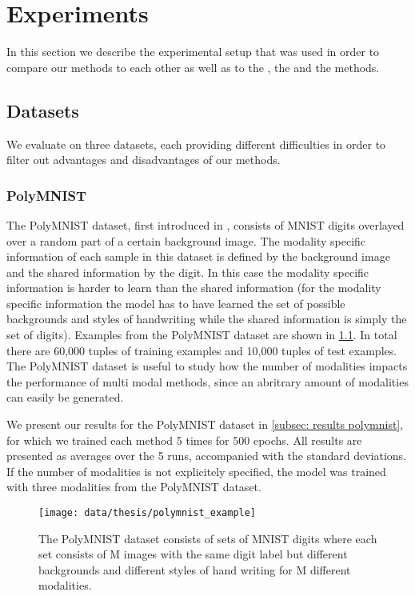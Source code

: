 \chapter{Experiments}
In this section we describe the experimental setup that was used in order to compare our methods to each other as well as to the , the  and the  methods.


\section{Datasets}
We evaluate on three datasets, each providing different difficulties in order to filter out advantages and disadvantages of our methods.

\subsection{PolyMNIST} \label{polymnist}
The PolyMNIST dataset, first introduced in \citep{sutter_multimodal_2020}, consists of MNIST digits overlayed over a random part of a certain background image.
The modality specific information of each sample in this dataset is defined by the background image and the shared information by the digit.
In this case the modality specific information is harder to learn than the shared information (for the modality specific information the model has to have learned the set of possible backgrounds and styles of handwriting while the shared information is simply the set of digits).
Examples from the PolyMNIST dataset are shown in \cref{fig:PolyMNIST}.
In total there are 60,000 tuples of training examples and 10,000 tuples of test examples.
The PolyMNIST dataset is useful to study how the number of modalities impacts the performance of multi modal methods, since an abritrary amount of modalities can easily be generated.

We present our results for the PolyMNIST dataset in \cref{subsec: results polymnist}, for which we trained each method 5 times for 500 epochs.
All results are presented as averages over the 5 runs, accompanied with the standard deviations.
If the number of modalities is not explicitely specified, the model was trained with three modalities from the PolyMNIST dataset.

\begin{figure}[h!]
    \centering
    \texttt{[image: data/thesis/polymnist\_example]}
    \caption{The PolyMNIST dataset consists of sets of MNIST
    digits where each set consists of M images
    with the same digit label but different backgrounds
    and different styles of hand writing for M different modalities.}
    \label{fig:PolyMNIST}
\end{figure}

